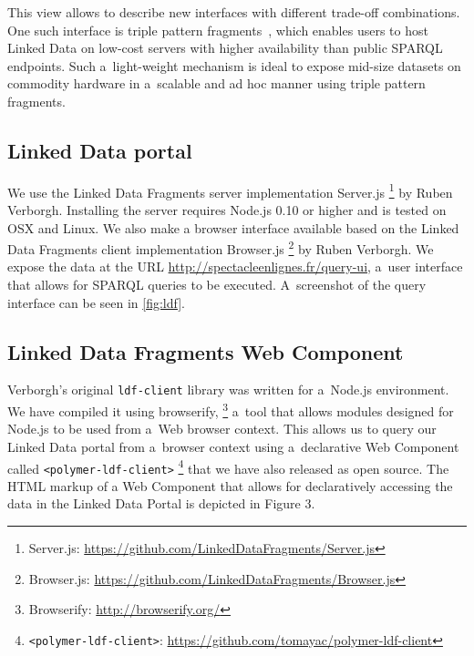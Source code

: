 \documentclass[runningheads,a4paper]{llncs}
\begin{document}
This view allows to describe new interfaces with different trade-off combinations.
One such interface is triple pattern fragments~\cite{verborgh2014triplepatterns},
which enables users to host Linked Data on low-cost servers with higher availability
than public SPARQL endpoints.
Such a~light-weight mechanism is ideal to expose mid-size datasets on commodity hardware
in a~scalable and ad hoc manner using triple pattern fragments.

\subsection{Linked Data portal}

We use the Linked Data Fragments server implementation Server.js%
\footnote{Server.js: \url{https://github.com/LinkedDataFragments/Server.js}} by Ruben Verborgh.
Installing the server requires Node.js 0.10 or higher and is tested on OSX and Linux.
We also make a browser interface available based on the Linked Data Fragments
client implementation Browser.js%
\footnote{Browser.js: \url{https://github.com/LinkedDataFragments/Browser.js}} by Ruben Verborgh.
We expose the data at the URL \url{http://spectacleenlignes.fr/query-ui},
a~user interface that allows for SPARQL queries to be executed.
A~screenshot of the query interface can be seen in \autoref{fig:ldf}.

\subsection{Linked Data Fragments Web Component}

Verborgh's original \texttt{ldf-client} library was written for a~Node.js environment.
We have compiled it using browserify,%
\footnote{Browserify: \url{http://browserify.org/}}
a~tool that allows modules designed for Node.js to be used from a~Web browser context.
This allows us to query our Linked Data portal from a~browser context using a~declarative Web Component
called \texttt{<polymer-ldf-client>}%
\footnote{\texttt{<polymer-ldf-client>}:
\url{https://github.com/tomayac/polymer-ldf-client}}
that we have also released as open source.
The HTML markup of a Web Component that allows for declaratively accessing the data in the Linked Data Portal is depicted in Figure 3.
\end{document}
